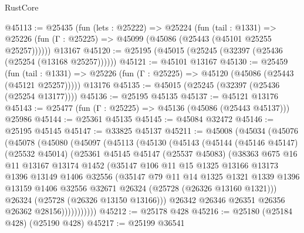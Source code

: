 \begin{lexlean}{RustCore}
\begin{coremodule}
@45113 := @25435
    (fun (lets : @25222) =>
    @25224
      (fun (tail : @1331) =>
      @25226 (fun (Γ : @25225) => @45099 (@45086 (@25443 (@45101 @25255 @25257))))))
    @13167
@45120 := @25195 (@45015 (@25245 (@32397 (@25436 (@25254 (@13168 @25257))))))
@45121 := @45101 @13167
@45130 := @25459
    (fun (tail : @1331) => @25226 (fun (Γ : @25225) => @45120 (@45086 (@25443 (@45121 @25257)))))
    @13176
@45135 := @45015 (@25245 (@32397 (@25436 (@25254 @13177))))
@45136 := @25195 @45135
@45137 := @45121 @13176
@45143 := @25477 (fun (Γ : @25225) => @45136 (@45086 (@25443 @45137))) @25986
@45144 := @25361 @45135
@45145 := @45084 @32472
@45146 := @25195 @45145
@45147 := @33825 @45137
@45211 := @45008
    (@45034
      (@45076
        (@45078
          (@45080
            (@45097
              (@45113
                (@45130
                  (@45143
                    (@45144
                      (@45146 @45147)
                      (@25532 @45014)
                      (@25361
                        @45145
                        @45147
                        (@25537 @45083)
                        (@38363
                          @675
                          @16
                          @11
                          @13167
                          @13174
                          @1452
                          (@35147
                            @106
                            @11
                            @15
                            @1325
                            @13166
                            @13173
                            @1396
                            @13149
                            @1406
                            @32556
                            (@35147
                              @79
                              @11
                              @14
                              @1325
                              @1321
                              @1339
                              @1396
                              @13159
                              @1406
                              @32556
                              @32671
                              @26324
                              (@25728 (@26326 @13160 @1321)))
                            @26324
                            (@25728 (@26326 @13150 @13166)))
                          @26342
                          @26346
                          @26351
                          @26356
                          @26362
                          @28156)))))))))))
@45212 := @25178 @428
@45216 := @25180 (@25184 @428) (@25190 @428)
@45217 := @25199 @36541

\end{coremodule}
\end{lexlean}
